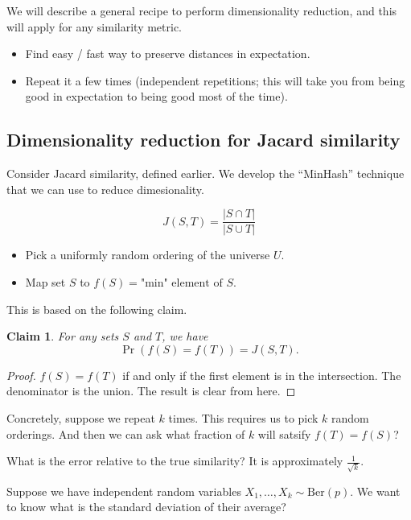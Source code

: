 \documentclass[12pt]{article}
\newtheorem*{claim}{Claim}
\def\Ber{\text{Ber}}
\begin{document}
We will describe a general recipe to perform dimensionality reduction, and this will apply for any similarity metric.

\begin{itemize}
  \item Find easy / fast way to preserve distances in expectation.
  \item Repeat it a few times (independent repetitions; this will take you from being good in expectation to being good most of the time).
\end{itemize}

\subsection{Dimensionality reduction for Jacard similarity}

Consider Jacard similarity, defined earlier.  We develop the ``MinHash'' technique that we can use to reduce dimesionality.

\[
  J(S, T) = \frac{|S \cap T|}{|S \cup T|}
\]

\begin{itemize}
  \item Pick a uniformly random ordering of the universe $U$.
  \item Map set $S$ to $f(S) = \text{"min" element of $S$}$.
\end{itemize}

This is based on the following claim. \\

\begin{claim}
  For any sets $S$ and $T$, we have
  \[
    \Pr(f(S) = f(T)) =J(S, T).
  \]
\end{claim}

\begin{proof}
$f(S) = f(T)$ if and only if the first element is in the intersection.  The denominator is the union.  The result is clear from here.
\end{proof}

Concretely, suppose we repeat $k$ times.  This requires us to pick $k$ random orderings.  And then we can ask what fraction of $k$ will satsify $f(T) = f(S)$?

What is the error relative to the true similarity?  It is approximately $\frac{1}{\sqrt{k}}$.

Suppose we have independent random variables $X_1, \dots, X_k \sim \Ber(p)$.  We want to know what is the standard deviation of their average?
\end{document}
